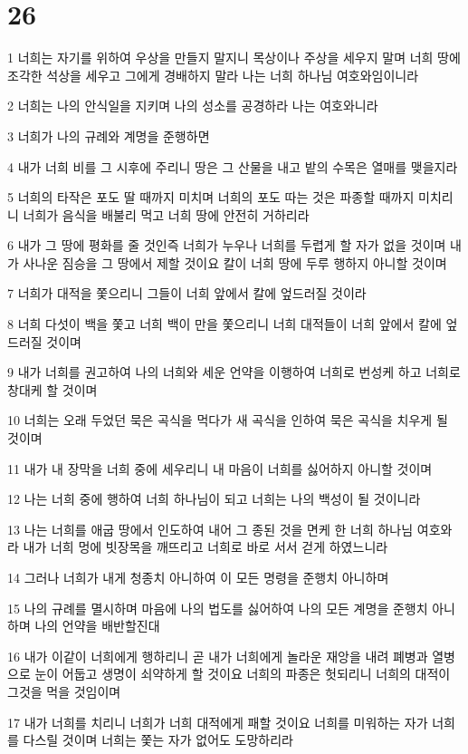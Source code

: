 \chapter{26}

\par 1 너희는 자기를 위하여 우상을 만들지 말지니 목상이나 주상을 세우지 말며 너희 땅에 조각한 석상을 세우고 그에게 경배하지 말라 나는 너희 하나님 여호와임이니라
\par 2 너희는 나의 안식일을 지키며 나의 성소를 공경하라 나는 여호와니라
\par 3 너희가 나의 규례와 계명을 준행하면
\par 4 내가 너희 비를 그 시후에 주리니 땅은 그 산물을 내고 밭의 수목은 열매를 맺을지라
\par 5 너희의 타작은 포도 딸 때까지 미치며 너희의 포도 따는 것은 파종할 때까지 미치리니 너희가 음식을 배불리 먹고 너희 땅에 안전히 거하리라
\par 6 내가 그 땅에 평화를 줄 것인즉 너희가 누우나 너희를 두렵게 할 자가 없을 것이며 내가 사나운 짐승을 그 땅에서 제할 것이요 칼이 너희 땅에 두루 행하지 아니할 것이며
\par 7 너희가 대적을 쫓으리니 그들이 너희 앞에서 칼에 엎드러질 것이라
\par 8 너희 다섯이 백을 쫓고 너희 백이 만을 쫓으리니 너희 대적들이 너희 앞에서 칼에 엎드러질 것이며
\par 9 내가 너희를 권고하여 나의 너희와 세운 언약을 이행하여 너희로 번성케 하고 너희로 창대케 할 것이며
\par 10 너희는 오래 두었던 묵은 곡식을 먹다가 새 곡식을 인하여 묵은 곡식을 치우게 될 것이며
\par 11 내가 내 장막을 너희 중에 세우리니 내 마음이 너희를 싫어하지 아니할 것이며
\par 12 나는 너희 중에 행하여 너희 하나님이 되고 너희는 나의 백성이 될 것이니라
\par 13 나는 너희를 애굽 땅에서 인도하여 내어 그 종된 것을 면케 한 너희 하나님 여호와라 내가 너희 멍에 빗장목을 깨뜨리고 너희로 바로 서서 걷게 하였느니라
\par 14 그러나 너희가 내게 청종치 아니하여 이 모든 명령을 준행치 아니하며
\par 15 나의 규례를 멸시하며 마음에 나의 법도를 싫어하여 나의 모든 계명을 준행치 아니하며 나의 언약을 배반할진대
\par 16 내가 이같이 너희에게 행하리니 곧 내가 너희에게 놀라운 재앙을 내려 폐병과 열병으로 눈이 어둡고 생명이 쇠약하게 할 것이요 너희의 파종은 헛되리니 너희의 대적이 그것을 먹을 것임이며
\par 17 내가 너희를 치리니 너희가 너희 대적에게 패할 것이요 너희를 미워하는 자가 너희를 다스릴 것이며 너희는 쫓는 자가 없어도 도망하리라

